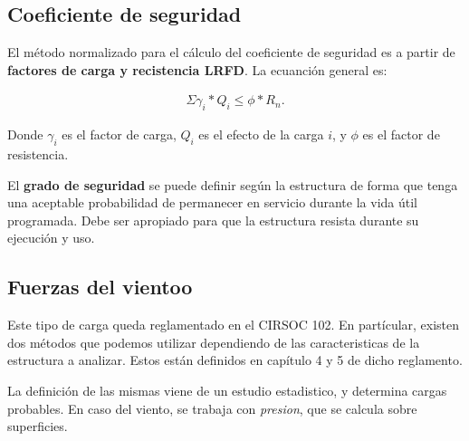 \documentclass[../main.tex]{subfiles}
\begin{document}
\subsection{Coeficiente de seguridad}

El método normalizado para el cálculo del coeficiente de seguridad es a partir
de \textbf{factores de carga y recistencia LRFD}. La ecuanción general es:

\begin{align*}
  \Sigma \gamma_i * Q_i \leq \phi*R_n
.\end{align*}

Donde $\gamma_i$ es el factor de carga, $Q_i$ es el efecto de la carga $i$, y 
$\phi$ es el factor de resistencia. 

El \textbf{grado de seguridad} se puede definir según la estructura de forma que
tenga una aceptable probabilidad de permanecer en servicio durante la vida útil
programada. Debe ser apropiado para que la estructura resista durante su
ejecución y uso.

\subsection{Fuerzas del vientoo}

Este tipo de carga queda reglamentado en el CIRSOC 102. En partícular, existen
dos métodos que podemos utilizar dependiendo de las caracteristicas de la 
estructura a analizar. Estos están definidos en capítulo 4 y 5 de dicho reglamento.

La definición de las mismas viene de un estudio estadistico, y determina cargas
probables. En caso del viento, se trabaja con \textit{presion}, que se calcula
sobre superficies.
\end{document}
